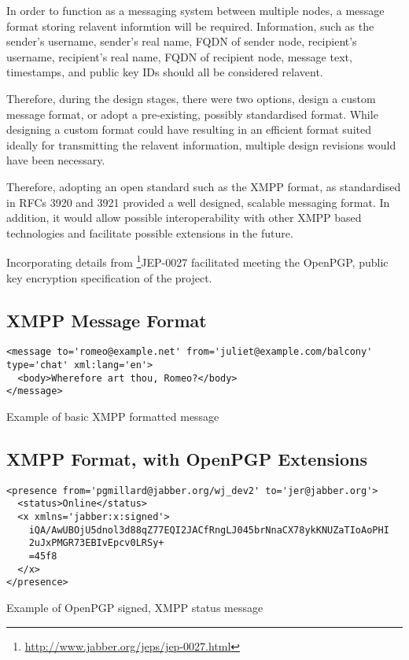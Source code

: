 
In order to function as a messaging system between multiple nodes, a
message format storing relavent informtion will be required. 
Information, such as the sender's username, sender's real name, FQDN of 
sender node, recipient's username, recipient's real name, FQDN of 
recipient node, message text, timestamps, and public key IDs should all
be considered relavent. 


Therefore, during the design stages, there were 
two options, design a custom message format, or adopt a pre-existing, 
possibly standardised format. While designing a custom format could have 
resulting in an efficient format suited ideally for transmitting the 
relavent information, multiple design revisions would have been 
necessary. 


Therefore, adopting an open standard such as the XMPP format, as 
standardised in RFCs 3920 and 3921 provided a well designed, scalable 
messaging format. In addition, it would allow possible interoperability 
with other XMPP based technologies and facilitate possible extensions 
in the future.


Incorporating details from
\footnote{\url{http://www.jabber.org/jeps/jep-0027.html}}{JEP-0027} 
facilitated meeting the OpenPGP, public key encryption 
specification of the project.

\subsection{XMPP Message Format}

\begin{table}[hbt]

\begin{verbatim}
<message to='romeo@example.net' from='juliet@example.com/balcony' 
type='chat' xml:lang='en'>
  <body>Wherefore art thou, Romeo?</body>
</message>
\end{verbatim}

\caption{Example of basic XMPP formatted message}

\end{table}


\subsection{XMPP Format, with OpenPGP Extensions}


\begin{table}[hbt]

\begin{verbatim}
<presence from='pgmillard@jabber.org/wj_dev2' to='jer@jabber.org'>
  <status>Online</status>
  <x xmlns='jabber:x:signed'>
    iQA/AwUBOjU5dnol3d88qZ77EQI2JACfRngLJ045brNnaCX78ykKNUZaTIoAoPHI
    2uJxPMGR73EBIvEpcv0LRSy+
    =45f8
  </x>
</presence>
\end{verbatim}

\caption{Example of OpenPGP signed, XMPP status message}

\end{table}


